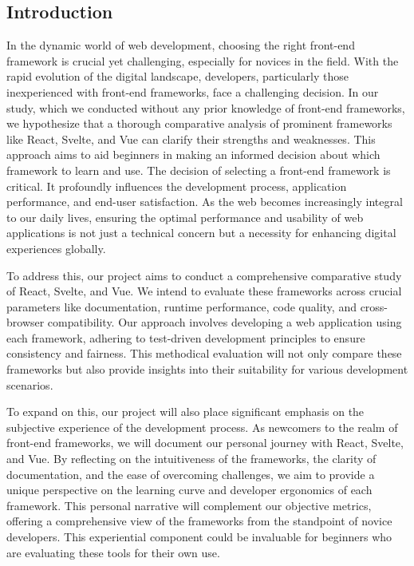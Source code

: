 \subsection*{Introduction}

In the dynamic world of web development, choosing the right front-end framework is crucial yet challenging, especially for novices in the field. With the rapid evolution of the digital landscape, developers, particularly those inexperienced with front-end frameworks, face a challenging decision. In our study, which we conducted without any prior knowledge of front-end frameworks, we hypothesize that a thorough comparative analysis of prominent frameworks like React, Svelte, and Vue can clarify their strengths and weaknesses. This approach aims to aid beginners in making an informed decision about which framework to learn and use.
The decision of selecting a front-end framework is critical. It profoundly influences the development process, application performance, and end-user satisfaction. As the web becomes increasingly integral to our daily lives, ensuring the optimal performance and usability of web applications is not just a technical concern but a necessity for enhancing digital experiences globally.

To address this, our project aims to conduct a comprehensive comparative study of React, Svelte, and Vue. We intend to evaluate these frameworks across crucial parameters like documentation, runtime performance, code quality, and cross-browser compatibility. Our approach involves developing a web application using each framework, adhering to test-driven development principles to ensure consistency and fairness. This methodical evaluation will not only compare these frameworks but also provide insights into their suitability for various development scenarios. 

To expand on this, our project will also place significant emphasis on the subjective experience of the development process. As newcomers to the realm of front-end frameworks, we will document our personal journey with React, Svelte, and Vue. By reflecting on the intuitiveness of the frameworks, the clarity of documentation, and the ease of overcoming challenges, we aim to provide a unique perspective on the learning curve and developer ergonomics of each framework. This personal narrative will complement our objective metrics, offering a comprehensive view of the frameworks from the standpoint of novice developers. This experiential component could be invaluable for beginners who are evaluating these tools for their own use.
